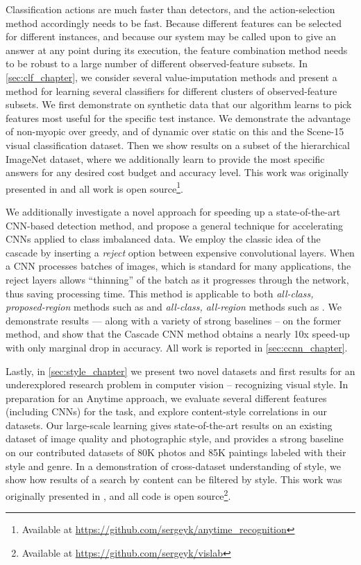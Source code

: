 Classification actions are much faster than detectors, and the action-selection method accordingly needs to be fast.
Because different features can be selected for different instances, and because our system may be called upon to give an answer at any point during its execution, the feature combination method needs to be robust to a large number of different observed-feature subsets.
In \autoref{sec:clf_chapter}, we consider several value-imputation methods and present a method for learning several classifiers for different clusters of observed-feature subsets.
We first demonstrate on synthetic data that our algorithm learns to pick features most useful for the specific test instance.
We demonstrate the advantage of non-myopic over greedy, and of dynamic over static on this and the Scene-15 visual classification dataset.
Then we show results on a subset of the hierarchical ImageNet dataset, where we additionally learn to provide the most specific answers for any desired cost budget and accuracy level.
This work was originally presented in \cite{Karayev-CVPR-2014} and all work is open source\footnote{Available at \url{https://github.com/sergeyk/anytime_recognition}}.

We additionally investigate a novel approach for speeding up a state-of-the-art CNN-based detection method, and propose a general technique for accelerating CNNs applied to class imbalanced data.
We employ the classic idea of the cascade by inserting a \emph{reject} option between expensive convolutional layers.
When a CNN processes batches of images, which is standard for many applications, the reject layers allows ``thinning'' of the batch as it progresses through the network, thus saving processing time.
This method is applicable to both \emph{all-class, proposed-region} methods such as \cite{Girshick-CVPR-2014} and \emph{all-class, all-region} methods such as \cite{He-ECCV-2014}.
We demonstrate results --- along with a variety of strong baselines -- on the former method, and show that the Cascade CNN method obtains a nearly 10x speed-up with only marginal drop in accuracy.
All work is reported in \autoref{sec:ccnn_chapter}.

Lastly, in \autoref{sec:style_chapter} we present two novel datasets and first results for an underexplored research problem in computer vision -- recognizing visual style.
In preparation for an Anytime approach, we evaluate several different features (including CNNs) for the task, and explore content-style correlations in our datasets.
Our large-scale learning gives state-of-the-art results on an existing dataset of image quality and photographic style, and provides a strong baseline on our contributed datasets of 80K photos and 85K paintings labeled with their style and genre.
In a demonstration of cross-dataset understanding of style, we show how results of a search by content can be filtered by style.
This work was originally presented in \cite{Karayev-BMVC-2014}, and all code is open source\footnote{Available at \url{https://github.com/sergeyk/vislab}}.

